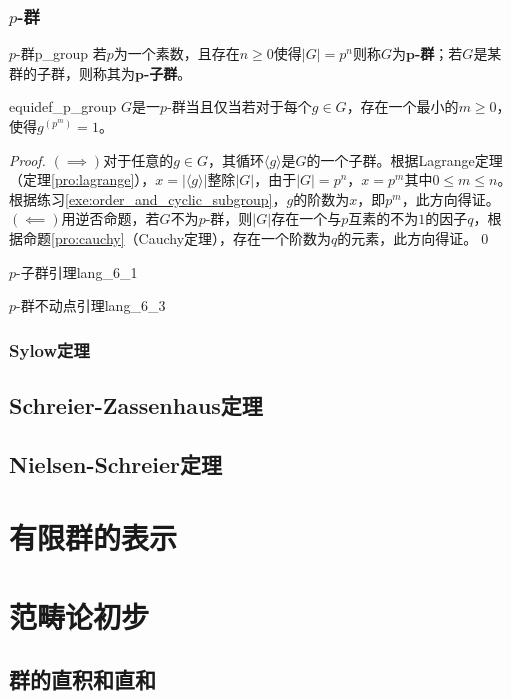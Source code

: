 \documentclass[../main.tex]{subfiles}
\begin{document}
\subsubsection{$p$-群}
\begin{definition}{$p$-群}{p_group}
若$p$为一个素数，且存在$n\geq0$使得$|G|=p^n$则称$G$为\textbf{$\mathbf{p}$-群}；若$G$是某群的子群，则称其为\textbf{$\mathbf{p}$-子群}。
\end{definition}
\begin{proposition}{}{equidef_p_group}
$G$是一$p$-群当且仅当若对于每个$g\in G$，存在一个最小的$m\geq0$，使得$g^{(p^m)}=1$。
\end{proposition}
\begin{proof}
$(\implies)$对于任意的$g\in G$，其循环$\langle g\rangle$是$G$的一个子群。根据Lagrange定理（定理\ref{pro:lagrange}），$x=|\langle g\rangle|$整除$|G|$，由于$|G|=p^n$，$x=p^m$其中$0\leq m\leq n$。根据练习\ref{exe:order_and_cyclic_subgroup}，$g$的阶数为$x$，即$p^m$，此方向得证。$(\impliedby)$用逆否命题，若$G$不为$p$-群，则$|G|$存在一个与$p$互素的不为$1$的因子$q$，根据命题\ref{pro:cauchy}（Cauchy定理），存在一个阶数为$q$的元素，此方向得证。\qed
\end{proof}
\begin{lemma}{$p$-子群引理}{lang_6_1}
\end{lemma}
\begin{lemma}{$p$-群不动点引理}{lang_6_3}
\end{lemma}
\subsubsection{Sylow定理}


\subsection{Schreier-Zassenhaus定理}
\subsection{Nielsen-Schreier定理}
\section{有限群的表示}
\section{范畴论初步}
\subsection{群的直积和直和}
\end{document}
